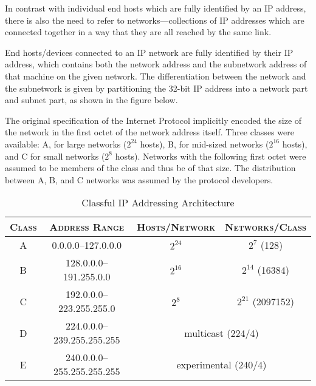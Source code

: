 In contrast with individual end hosts which are fully identified by an IP address, there is also the need to refer to networks---collections of IP addresses which are connected together in a way that they are all reached by the same link.


End hosts/devices connected to an IP network are fully identified by their IP address, which contains both the network address and the subnetwork address of that machine on the given network. The differentiation between the network and the subnetwork is given by partitioning the 32-bit IP address into a network part and subnet part, as shown in the figure below.

The original specification of the Internet Protocol implicitly encoded the size of the network in the first octet of the network address itself. Three classes were available: A, for large networks ($2^{24}$ hosts), B, for mid-sized networks ($2^{16}$ hosts), and C for small networks ($2^{8}$ hosts). Networks with the following first octet were assumed to be members of the class and thus be of that size. The distribution between A, B, and C networks was assumed by the protocol developers.

\begin{table}[h]
\begin{center}
\begin{singlespace}
\begin{tabular}{ c | c | c | c }
    \textsc{Class} & \textsc{Address Range} & \textsc{Hosts/Network} & \textsc{Networks/Class} \\
    \hline
	A & 0.0.0.0--127.0.0.0         & $2^{24}$ & $2^{7}$ (128)               \\
	B & 128.0.0.0--191.255.0.0     & $2^{16}$ & $2^{14}$ (16384)            \\
	C & 192.0.0.0--223.255.255.0   & $2^{8}$  & $2^{21}$ (2097152)          \\
	D & 224.0.0.0--239.255.255.255 & \multicolumn{2}{c}{multicast (224/4)} \\
	E & 240.0.0.0--255.255.255.255 & \multicolumn{2}{c}{experimental (240/4)}
\end{tabular}
\end{singlespace}
\end{center}
\caption{Classful IP Addressing Architecture \cite{rfc791}}
\end{table}

